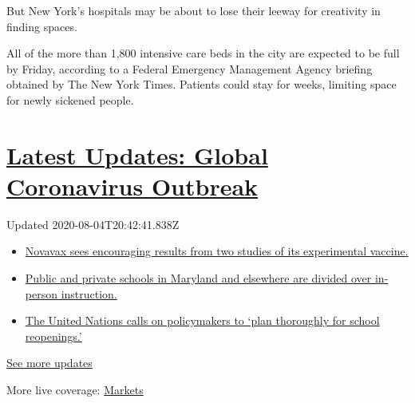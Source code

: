 But New York's hospitals may be about to lose their leeway for
creativity in finding spaces.

All of the more than 1,800 intensive care beds in the city are expected
to be full by Friday, according to a Federal Emergency Management Agency
briefing obtained by The New York Times. Patients could stay for weeks,
limiting space for newly sickened people.

\hypertarget{latest-updates-global-coronavirus-outbreak}{%
\section{\texorpdfstring{\href{https://www.nytimes.com/2020/08/04/world/coronavirus-cases.html?action=click\&pgtype=Article\&state=default\&region=MAIN_CONTENT_1\&context=storylines_live_updates}{Latest
Updates: Global Coronavirus
Outbreak}}{Latest Updates: Global Coronavirus Outbreak}}\label{latest-updates-global-coronavirus-outbreak}}

Updated 2020-08-04T20:42:41.838Z

\begin{itemize}
\tightlist
\item
  \href{https://www.nytimes.com/2020/08/04/world/coronavirus-cases.html?action=click\&pgtype=Article\&state=default\&region=MAIN_CONTENT_1\&context=storylines_live_updates\#link-1228a480}{Novavax
  sees encouraging results from two studies of its experimental
  vaccine.}
\item
  \href{https://www.nytimes.com/2020/08/04/world/coronavirus-cases.html?action=click\&pgtype=Article\&state=default\&region=MAIN_CONTENT_1\&context=storylines_live_updates\#link-4825b93}{Public
  and private schools in Maryland and elsewhere are divided over
  in-person instruction.}
\item
  \href{https://www.nytimes.com/2020/08/04/world/coronavirus-cases.html?action=click\&pgtype=Article\&state=default\&region=MAIN_CONTENT_1\&context=storylines_live_updates\#link-50f7386d}{The
  United Nations calls on policymakers to `plan thoroughly for school
  reopenings.'}
\end{itemize}

\href{https://www.nytimes.com/2020/08/04/world/coronavirus-cases.html?action=click\&pgtype=Article\&state=default\&region=MAIN_CONTENT_1\&context=storylines_live_updates}{See
more updates}

More live coverage:
\href{https://www.nytimes.com/live/2020/08/04/business/stock-market-today-coronavirus?action=click\&pgtype=Article\&state=default\&region=MAIN_CONTENT_1\&context=storylines_live_updates}{Markets}

